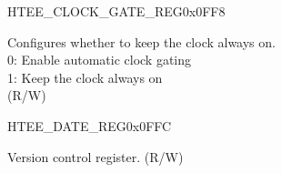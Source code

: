 \begin{register}{H}{TEE\_CLOCK\_GATE\_REG}{0x0FF8}\label{regdesc:TEECLOCKGATEREG}
%
%
\regnewline%
\begin{regdesc}\begin{reglist}
\label{fielddesc:TEECLKEN}\item [TEE\_CLK\_EN] Configures whether to keep the clock always on.\\
0: Enable automatic clock gating \\
1: Keep the clock always on  \\
(R/W)
\end{reglist}\end{regdesc}
\end{register}


\begin{register}{H}{TEE\_DATE\_REG}{0x0FFC}\label{regdesc:TEEDATEREG}
%
%
\regnewline%
\begin{regdesc}\begin{reglist}
\label{fielddesc:TEEDATE}\item [TEE\_DATE] Version control register. (R/W)
\end{reglist}\end{regdesc}
\end{register}


